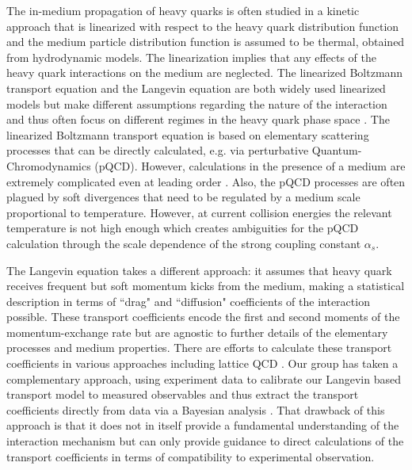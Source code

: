 \documentclass[aps, prc, reprint, amsmath, groupedaddress, nofootinbib]{revtex4-1}
\begin{document}
The in-medium propagation of heavy quarks is often studied in a kinetic approach that is linearized with respect to the heavy quark distribution function and the medium particle distribution function is assumed to be thermal, obtained from hydrodynamic models.
The linearization implies that any effects of the heavy quark interactions on the medium are neglected.
The linearized Boltzmann transport equation and the Langevin equation are both widely used linearized models but make different assumptions regarding the nature of the interaction and thus often focus on different regimes in the heavy quark phase space \cite{Auvinen:2009qm,Cao:2016gvr, Cao:2017hhk, PhysRevD.37.2484, Moore:2004tg}.
The linearized Boltzmann transport equation  is based on elementary scattering processes that can be directly calculated, e.g. via perturbative Quantum-Chromodynamics (pQCD).
However, calculations in the presence of a medium are extremely complicated even at leading order \cite{Arnold:2002zm}.
Also, the pQCD processes are often plagued by soft divergences that need to be regulated by a medium scale proportional to temperature. However, at current collision energies the relevant temperature is not high enough which creates ambiguities for the pQCD calculation through the scale dependence of the strong coupling constant $\alpha_s$.

The Langevin equation takes a different approach: 
it assumes that heavy quark receives frequent but soft momentum kicks from the medium, making a statistical description in terms of ``drag" and ``diffusion" coefficients of the interaction possible.
These transport coefficients encode the first and second moments of the momentum-exchange rate but are agnostic to further details of the elementary processes and medium properties.
There are efforts to calculate these transport coefficients in various approaches including lattice QCD \cite{Moore:2004tg,CaronHuot:2008uh, Gossiaux:2008jv,He:2012df,Riek:2010fk,vanHees:2007me,Scardina:2017ipo,Ding:2012sp,Banerjee:2011ra}. Our group has taken a complementary approach, using experiment data to calibrate our Langevin based transport model to measured observables and thus extract the transport coefficients directly from data via a Bayesian analysis \cite{}. That drawback of this approach is that it does not in itself provide a fundamental understanding of the interaction mechanism but can only provide guidance to direct calculations of the transport coefficients in terms of compatibility to experimental observation.
\end{document}
